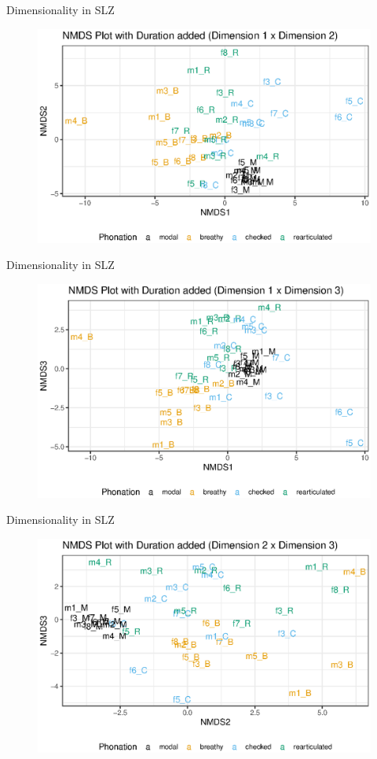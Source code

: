 \documentclass{beamer}
\begin{document}
\begin{frame}{Dimensionality in SLZ}
  \begin{figure}
    \centering
    \includegraphics[width = 0.8\linewidth]{images/MDS/nmds12_dur.eps}
  \end{figure}
\end{frame}

\begin{frame}{Dimensionality in SLZ}
  \begin{figure}
    \centering
    \includegraphics[width = 0.8\linewidth]{images/MDS/nmds13_dur.eps}
  \end{figure}
\end{frame}

\begin{frame}{Dimensionality in SLZ}
  \begin{figure}
    \centering
    \includegraphics[width = 0.8\linewidth]{images/MDS/nmds23_dur.eps}
  \end{figure}
\end{frame}
\end{document}
